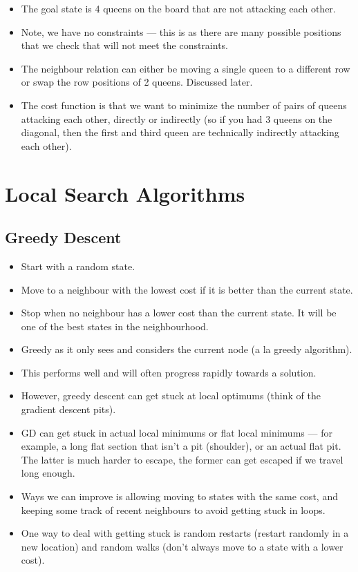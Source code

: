 \documentclass{article}
\begin{document}
\begin{itemize}
\begin{itemize}
            \item The goal state is 4 queens on the board that are not attacking each other.
            \item Note, we have no constraints --- this is as there are many possible positions that we check that will not meet the constraints.
            \item The neighbour relation can either be moving a single queen to a different row or swap the row positions of 2 queens.  Discussed later.
            \item The cost function is that we want to minimize the number of pairs of queens attacking each other, directly or indirectly (so if you had 3 queens on the diagonal, then the first and third queen are technically indirectly attacking each other).
        \end{itemize}
\end{itemize}

\section{Local Search Algorithms}
\subsection{Greedy Descent}
\begin{itemize}
    \item Start with a random state.
    \item Move to a neighbour with the lowest cost if it is better than the current state.
    \item Stop when no neighbour has a lower cost than the current state.  It will be one of the best states in the neighbourhood.
    \item Greedy as it only sees and considers the current node (a la greedy algorithm).
    \item This performs well and will often progress rapidly towards a solution.
    \item However, greedy descent can get stuck at local optimums (think of the gradient descent pits).
    \item GD can get stuck in actual local minimums or flat local minimums --- for example, a long flat section that isn't a pit (shoulder), or an actual flat pit.  The latter is much harder to escape, the former can get escaped if we travel long enough.
    \item Ways we can improve is allowing moving to states with the same cost, and keeping some track of recent neighbours to avoid getting stuck in loops.
    \item One way to deal with getting stuck is random restarts (restart randomly in a new location) and random walks (don't always move to a state with a lower cost).
\end{itemize}
\end{document}
